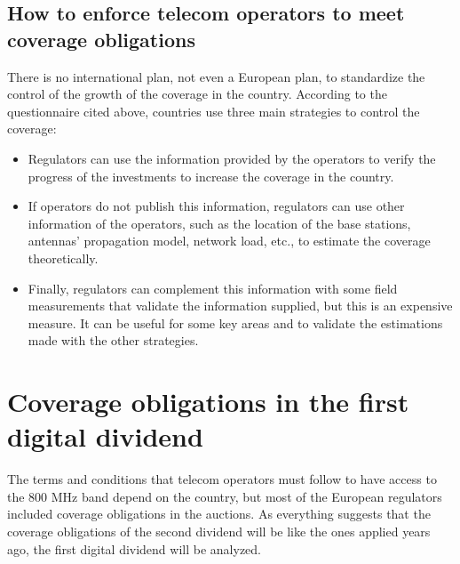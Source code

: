 {\subsection*{How to enforce telecom operators to meet coverage obligations}
There is no international plan, not even a European plan, to standardize the control of the growth of the coverage in the country. According to the questionnaire cited above, countries use three main strategies to control the coverage:\par

\begin{itemize}
	\item Regulators can use the information provided by the operators to verify the progress of the investments to increase the coverage in the country.\par

	\item If operators do not publish this information, regulators can use other information of the operators, such as the location of the base stations, antennas’ propagation model, network load, etc., to estimate the coverage theoretically.\par

	\item Finally, regulators can complement this information with some field measurements that validate the information supplied, but this is an expensive measure. It can be useful for some key areas and to validate the estimations made with the other strategies.
\end{itemize}\par















\section{Coverage obligations in the first digital dividend}
The terms and conditions that telecom operators must follow to have access to the 800 MHz band depend on the country, but most of the European regulators included coverage obligations in the auctions. As everything suggests that the coverage obligations of the second dividend will be like the ones applied years ago, the first digital dividend will be analyzed.\par

}

